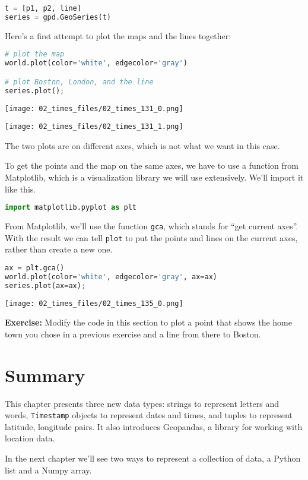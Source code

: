 \begin{lstlisting}[language=Python,style=source]
t = [p1, p2, line]
series = gpd.GeoSeries(t)
\end{lstlisting}

Here's a first attempt to plot the maps and the lines together:

\begin{lstlisting}[language=Python,style=source]
# plot the map
world.plot(color='white', edgecolor='gray')

# plot Boston, London, and the line
series.plot();
\end{lstlisting}

\begin{center}
\texttt{[image: 02\_times\_files/02\_times\_131\_0.png]}
\end{center}

\begin{center}
\texttt{[image: 02\_times\_files/02\_times\_131\_1.png]}
\end{center}

The two plots are on different axes, which is not what we want in this
case.

To get the points and the map on the same axes, we have to use a
function from Matplotlib, which is a visualization library we will use
extensively. We'll import it like this.

\begin{lstlisting}[language=Python,style=source]
import matplotlib.pyplot as plt
\end{lstlisting}

From Matplotlib, we'll use the function \passthrough{\lstinline!gca!},
which stands for ``get current axes''. With the result we can tell
\passthrough{\lstinline!plot!} to put the points and lines on the
current axes, rather than create a new one.

\begin{lstlisting}[language=Python,style=source]
ax = plt.gca()
world.plot(color='white', edgecolor='gray', ax=ax)
series.plot(ax=ax);
\end{lstlisting}

\begin{center}
\texttt{[image: 02\_times\_files/02\_times\_135\_0.png]}
\end{center}

\textbf{Exercise:} Modify the code in this section to plot a point that
shows the home town you chose in a previous exercise and a line from
there to Boston.

\section{Summary}\label{summary}

This chapter presents three new data types: strings to represent letters
and words, \passthrough{\lstinline!Timestamp!} objects to represent
dates and times, and tuples to represent latitude, longitude pairs. It
also introduces Geopandas, a library for working with location data.

In the next chapter we'll see two ways to represent a collection of
data, a Python list and a Numpy array.
